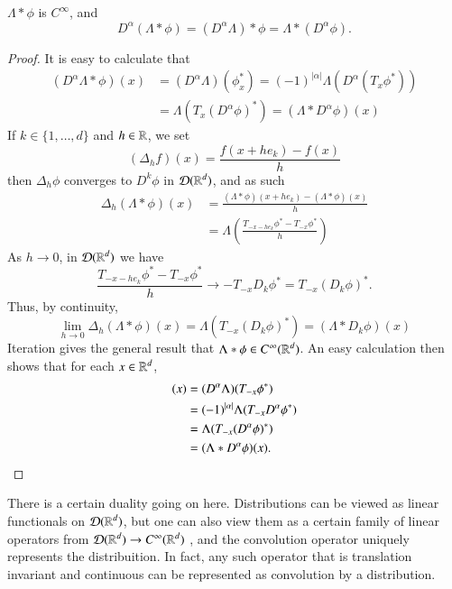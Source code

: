 \begin{theorem}
    $\Lambda * \phi$ is $C^\infty$, and
    \[ D^\alpha(\Lambda * \phi) = (D^\alpha \Lambda) * \phi = \Lambda * (D^\alpha \phi). \]
\end{theorem}
\begin{proof}
    It is easy to calculate that
    \begin{align*}
        (D^\alpha \Lambda * \phi)(x) &= (D^\alpha \Lambda)(\phi^*_x) = (-1)^{|\alpha|} \Lambda(D^\alpha (T_x \phi^*))\\
        &= \Lambda(T_x (D^\alpha \phi)^*) = (\Lambda * D^\alpha \phi)(x)
    \end{align*}
    If $k \in \{ 1, \dots, d \}$ and $h \in \operatorname{\mathbb{R}}$, we set
    \[ (\Delta_h f)(x) = \frac{f(x + he_k) - f(x)}{h} \]
    then $\Delta_h \phi$ converges to $D^k \phi$ in $\operatorname{\mathcal{D}}(\operatorname{\mathbb{R}}^d)$, and as such
    \begin{align*}
      \Delta_h(\Lambda * \phi)(x) &= \frac{(\Lambda * \phi)(x + he_k) - (\Lambda * \phi)(x)}{ h}\\
      &= \Lambda \left( \frac{T_{-x - he_k} \phi^* - T_{-x} \phi^*}{h} \right)
    \end{align*}
    As $h \to 0$, in $\operatorname{\mathcal{D}}(\operatorname{\mathbb{R}}^d)$ we have
    \[ \frac{T_{-x - he_k} \phi^* - T_{-x} \phi^*}{h} \to - T_{-x} D_k \phi^* = T_{-x} (D_k \phi)^*. \]
    Thus, by continuity,
    \[ \lim_{h \to 0} \Delta_h(\Lambda * \phi)(x) = \Lambda(T_{-x} (D_k \phi)^*) = (\Lambda * D_k \phi)(x) \]
    Iteration gives the general result that $\Lambda * \phi \in C^\infty(\operatorname{\mathbb{R}}^d)$. An easy calculation then shows that for each $x \in \operatorname{\mathbb{R}}^d$,
    \begin{align*}
      [(D^\alpha \Lambda) * \phi](x) &= (D^\alpha \Lambda)(T_{-x} \phi^*)\\
      &= (-1)^{|\alpha|} \Lambda(T_{-x} D^\alpha \phi^*)\\
      &= \Lambda(T_{-x} (D^\alpha \phi)^*)\\
      &= (\Lambda * D^\alpha \phi)(x). \qedhere
    \end{align*}
\end{proof}

There is a certain duality going on here. Distributions can be viewed as linear functionals on $\operatorname{\mathcal{D}}(\operatorname{\mathbb{R}}^d)$, but one can also view them as a certain family of linear operators from $\operatorname{\mathcal{D}}(\operatorname{\mathbb{R}}^d) \to C^\infty(\operatorname{\mathbb{R}}^d)$ , and the convolution operator uniquely represents the distribuition. In fact, any such operator that is translation invariant and continuous can be represented as convolution by a distribution.


